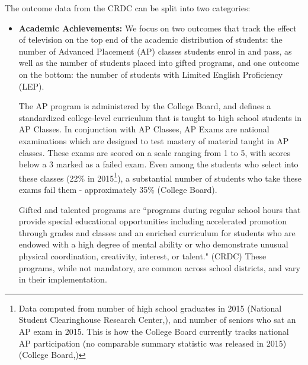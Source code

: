\documentclass[11pt]{article}
\begin{document}
The outcome data from the CRDC can be split into two categories:
\begin{itemize}
\item \textbf{Academic Achievements:} We focus on two outcomes that track the effect of television on the top end of the academic distribution of students: the number of Advanced Placement (AP) classes students enrol in and pass, as well as the number of students placed into gifted programs, and one outcome on the bottom: the number of students with Limited English Proficiency (LEP).

The AP program is administered by the College Board, and defines a standardized college-level curriculum that is taught to high school students in AP Classes. In conjunction with AP Classes, AP Exams are national examinations which are designed to test mastery of material taught in AP classes. These exams are scored on a scale ranging from 1 to 5, with scores below a 3 marked as a failed exam. Even among the students who select into these classes (22\% in 2015\footnote{ Data computed from number of high school graduates in 2015 (National Student Clearinghouse Research Center,\cite{noauthor_high_2015}), and number of seniors who sat an AP exam in 2015. This is how the College Board currently tracks national AP participation (no comparable summary statistic was released in 2015) (College Board,\cite{noauthor_ap_2015})}), a substantial number of students who take these exams fail them - approximately 35\% (College Board\cite{noauthor_ap_2020}). 

Gifted and talented programs are ``programs during regular school hours that provide special educational opportunities including accelerated promotion through grades and classes and an enriched curriculum for students who are endowed with a high degree of mental ability or who demonstrate unusual physical coordination, creativity, interest, or talent." (CRDC\cite{noauthor_master_2016}) These programs, while not mandatory, are common across school districts, and vary in their implementation. %


\end{itemize}
\end{document}
